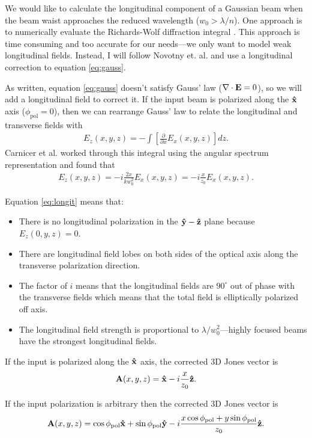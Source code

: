 \documentclass[11pt]{article}
\begin{document}
We would like to calculate the longitudinal component of a Gaussian beam when
the beam waist approaches the reduced wavelength ($w_0 > \lambda/n$). One
approach is to numerically evaluate the Richards-Wolf diffraction integral
\cite{richards, biobeam}. This approach is time consuming and too
accurate for our needs---we only want to model weak longitudinal
fields. Instead, I will follow Novotny et. al. \cite{nov} and use a longitudinal
correction to equation \ref{eq:gauss}.

As written, equation \ref{eq:gauss} doesn't satisfy Gauss' law
($\nabla \cdot \mathbf{E} = 0$), so we will add a longitudinal field to correct
it. If the input beam is polarized along the $\mathbf{\hat{x}}$ axis
($\phi_{\text{pol}}=0$), then we can rearrange Gauss' law to relate the
longitudinal and transverse fields with
\begin{align}
  E_z(x, y, z) = - \int \left[\frac{\partial}{\partial x} E_x(x,y,z)\right]dz. 
\end{align}
Carnicer et al. \cite{carnicer} worked through this integral using the angular
spectrum representation and found that
\begin{align}
  E_z(x,y,z) = -i\frac{2x}{kw_0^2}E_x(x,y,z) = -i\frac{x}{z_0}E_x(x,y,z)\label{eq:longit}. 
\end{align}

Equation \ref{eq:longit} means that:
\begin{itemize}
\item There is no longitudinal polarization in the $\mathbf{\hat{y}}-\mathbf{\hat{z}}$ plane
  because $E_z(0,y,z) = 0$.
\item There are longitudinal field lobes on both sides of the optical axis
  along the transverse polarization direction.
\item The factor of $i$ means that the longitudinal fields are $90^{\circ}$ out
  of phase with the transverse fields which means that the total field is
  elliptically polarized off axis.
\item The longitudinal field strength is proportional to
  $\lambda/w_0^2$---highly focused beams have the strongest longitudinal fields.
\end{itemize}

If the input is polarized along the $\mathbf{\hat{x}}$ axis, the corrected 3D Jones vector is
\begin{align}
\mathbf{A}(x,y,z) = \mathbf{\hat{x}}- i\frac{x}{z_0}\mathbf{\hat{z}}.
\end{align}

If the input polarization is arbitrary then the corrected 3D Jones vector is
\begin{align}
  \mathbf{A}(x,y,z) = \cos\phi_{\text{pol}}\mathbf{\hat{x}} + \sin\phi_{\text{pol}}\mathbf{\hat{y}} - i\frac{x\cos\phi_{\text{pol}} + y\sin\phi_{\text{pol}}}{z_0}\mathbf{\hat{z}}.
\end{align}
\end{document}
